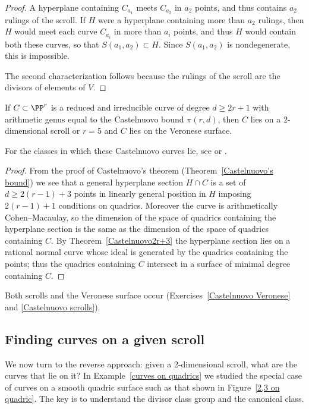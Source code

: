 \begin{proof}
A hyperplane containing $C_{a_1}$ meets $C_{a_2}$ in $a_2$
points, and thus contains $a_2$ rulings of the scroll. If $H$ were a
hyperplane containing more than $a_2$
rulings, then $H$ would meet each curve $C_{a_i}$ in more than $a_i$
points, and thus $H$ would contain
both these curves, so that $S(a_1,a_2)\subset H$. Since $S(a_1,a_2)$
is nondegenerate, this is impossible.

The second characterization follows because the rulings of the scroll
are the divisors of elements of $V$.
\end{proof}

\begin{theorem}\label{Castelnuovo examples}
If $C\subset \PP^r$ is a reduced and irreducible curve of degree $d\geq
2r+1$ with arithmetic genus equal to
the
%
%
Castelnuovo bound $\pi(r,d)$, then $C$ lies on a 2-dimensional scroll
or $r=5$ and $C$ lies on  the 
Veronese surface.
%
\unif
\end{theorem}

For the classes in which these Castelnuovo curves lie, see \cite[Theorem
3.11]{MR685427} or \cite[p.~533]{Griffiths-Harris1978}.
\unif

\begin{proof}
From the proof of Castelnuovo's theorem (Theorem~\ref{Castelnuovo's
bound}) we see that a general hyperplane
section $H\cap C$ is a set of $d\geq 2(r-1)+3$ points in linearly general
position in $H$ imposing $2(r-1)+1$ conditions on quadrics. Moreover
the curve
is arithmetically Cohen--Macaulay, so the dimension of the space of
quadrics containing the hyperplane section
is the same as the dimension of the space of quadrics containing $C$. By
Theorem~\ref{Castelnuovo2r+3} the hyperplane
section lies on a rational normal curve whose ideal is generated by the
quadrics containing the points;
thus the quadrics containing $C$ intersect in a surface of minimal degree
containing $C$.
\unif
\end{proof}

Both scrolls and the Veronese surface occur (Exercises~\ref{Castelnuovo
Veronese} and \ref{Castelnuovo scrolls}).

\subsection*{Finding curves on a given scroll}

We now turn to the reverse approach: given a 2-dimensional scroll,
what are the curves that lie on it?
In Example~\ref{curves on quadrics} we studied the special case of
curves on a smooth quadric surface such as that shown in 
Figure~\ref{2,3 on quadric}.
The key is to understand the divisor class group and the canonical class.

